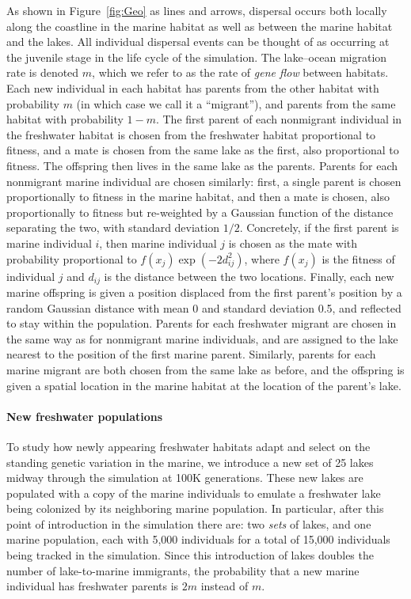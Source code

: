 \documentclass{article}
\begin{document}
As shown in Figure~\ref{fig:Geo} as lines and arrows, dispersal occurs both locally along the coastline in the marine habitat
as well as between the marine habitat and the lakes.
All individual dispersal events can be thought of as occurring at the juvenile stage in the life cycle of the simulation. 
The lake--ocean migration rate is denoted $m$, 
which we refer to as the rate of \emph{gene flow} between habitats.
Each new individual in each habitat 
has parents from the other habitat with probability $m$ 
(in which case we call it a ``migrant''),
and parents from the same habitat with probability $1-m$.
The first parent of each nonmigrant individual in the freshwater habitat
is chosen from the freshwater habitat proportional to fitness, 
and a mate is chosen from the same lake as the first, also proportional to fitness. 
The offspring then lives in the same lake as the parents.
Parents for each nonmigrant marine individual are chosen similarly:
first, a single parent is chosen proportionally to fitness in the marine habitat,
and then a mate is chosen, also proportionally to fitness but re-weighted by a Gaussian function of the distance separating the two, with standard deviation $1/2$. 
Concretely, if the first parent is marine individual $i$, 
then marine individual $j$ is chosen as the mate with probability proportional to $f(x_j) \exp(-2d_{ij}^2)$,
where $f(x_j)$ is the fitness of individual $j$ and $d_{ij}$ is the distance between the two locations. 
Finally, each new marine offspring is given a position displaced from the first parent's position by a random Gaussian distance with mean 0 and standard deviation 0.5, 
and reflected to stay within the population.
Parents for each freshwater migrant are chosen in the same way
as for nonmigrant marine individuals,
and are assigned to the lake nearest to the position of the first marine parent.
Similarly, parents for each marine migrant are both chosen from the same lake as before,
and the offspring is given a spatial location in the marine habitat at the location of the parent's lake. 

\paragraph{New freshwater populations} 
To study how newly appearing freshwater habitats adapt and select on the standing genetic variation in the marine, we introduce a new set of 25 lakes midway through the simulation at 100K generations.
These new lakes are populated with a copy of the marine individuals to emulate a freshwater lake being colonized by its neighboring marine population. 
In particular, after this point of introduction in the simulation there are:
two \emph{sets} of lakes, and one marine population, each with 5,000 individuals for a total of 15,000 individuals being tracked in the simulation. 
Since this introduction of lakes doubles the number of lake-to-marine immigrants, 
the probability that a new marine individual has freshwater parents is $2m$ instead of $m$.
\end{document}
